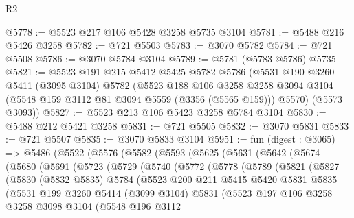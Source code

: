 \begin{lexlean}{R2}
\begin{coremodule}
@5778 := @5523 @217 @106 @5428 @3258 @5735 @3104
@5781 := @5488 @216 @5426 @3258
@5782 := @721 @5503
@5783 := @3070 @5782
@5784 := @721 @5508
@5786 := @3070 @5784 @3104
@5789 := @5781 (@5783 @5786) @5735
@5821 := @5523
    @191
    @215
    @5412
    @5425
    @5782
    @5786
    (@5531
      @190
      @3260
      @5411
      (@3095 @3104)
      @5782
      (@5523
        @188
        @106
        @3258
        @3258
        @3094
        @3104
        (@5548 @159 @3112 @81 @3094 @5559 (@3356 (@5565 @159)))
        @5570)
      (@5573 @3093))
@5827 := @5523 @213 @106 @5423 @3258 @5784 @3104
@5830 := @5488 @212 @5421 @3258
@5831 := @721 @5505
@5832 := @3070 @5831
@5833 := @721 @5507
@5835 := @3070 @5833 @3104
@5951 := fun (digest : @3065) =>
  @5486
    (@5522
      (@5576
        (@5582
          (@5593
            (@5625
              (@5631
                (@5642
                  (@5674
                    (@5680
                      (@5691
                        (@5723
                          (@5729
                            (@5740
                              (@5772
                                (@5778
                                  (@5789
                                    (@5821
                                      (@5827
                                        (@5830
                                          (@5832 @5835)
                                          @5784
                                          (@5523
                                            @200
                                            @211
                                            @5415
                                            @5420
                                            @5831
                                            @5835
                                            (@5531
                                              @199
                                              @3260
                                              @5414
                                              (@3099 @3104)
                                              @5831
                                              (@5523
                                                @197
                                                @106
                                                @3258
                                                @3258
                                                @3098
                                                @3104
                                                (@5548
                                                  @196
                                                  @3112

\end{coremodule}
\end{lexlean}
